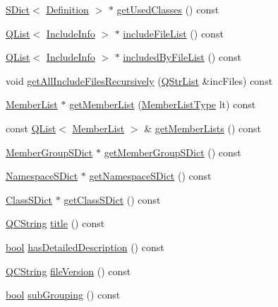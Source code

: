 \begin{DoxyCompactItemize}
\hyperlink{class_s_dict}{S\+Dict}$<$ \hyperlink{class_definition}{Definition} $>$ $\ast$ \hyperlink{class_file_def_a5d56f458c2c6861233549a68215648f7}{get\+Used\+Classes} () const 
\item 
\hyperlink{class_q_list}{Q\+List}$<$ \hyperlink{struct_include_info}{Include\+Info} $>$ $\ast$ \hyperlink{class_file_def_a64b496d47ff8886b45b067367a36cda1}{include\+File\+List} () const 
\item 
\hyperlink{class_q_list}{Q\+List}$<$ \hyperlink{struct_include_info}{Include\+Info} $>$ $\ast$ \hyperlink{class_file_def_aeb30afe2773a1b340af0b5ad29d30ee4}{included\+By\+File\+List} () const 
\item 
void \hyperlink{class_file_def_ac1199e20e088fb05237bf3cd25e8033a}{get\+All\+Include\+Files\+Recursively} (\hyperlink{class_q_str_list}{Q\+Str\+List} \&inc\+Files) const 
\item 
\hyperlink{class_member_list}{Member\+List} $\ast$ \hyperlink{class_file_def_ae15a5a31c32a3fc47acc8b4d6018290f}{get\+Member\+List} (\hyperlink{types_8h_abe8ad5992f8938a28f918f51b199aa19}{Member\+List\+Type} lt) const 
\item 
const \hyperlink{class_q_list}{Q\+List}$<$ \hyperlink{class_member_list}{Member\+List} $>$ \& \hyperlink{class_file_def_a69be4bdc0b4c2793c0d30da65bec5e7b}{get\+Member\+Lists} () const 
\item 
\hyperlink{class_member_group_s_dict}{Member\+Group\+S\+Dict} $\ast$ \hyperlink{class_file_def_a520275a99d696445fbe8dfcacc14ba74}{get\+Member\+Group\+S\+Dict} () const 
\item 
\hyperlink{class_namespace_s_dict}{Namespace\+S\+Dict} $\ast$ \hyperlink{class_file_def_abe6ba0cda81e22e0f5320950bd861ca4}{get\+Namespace\+S\+Dict} () const 
\item 
\hyperlink{class_class_s_dict}{Class\+S\+Dict} $\ast$ \hyperlink{class_file_def_a7b4074e0b92a75975408cafac16a2dee}{get\+Class\+S\+Dict} () const 
\item 
\hyperlink{class_q_c_string}{Q\+C\+String} \hyperlink{class_file_def_a9b02edce3b68a6b9905759eac45506af}{title} () const 
\item 
\hyperlink{qglobal_8h_a1062901a7428fdd9c7f180f5e01ea056}{bool} \hyperlink{class_file_def_aa529a9b7693dfc7356fd2ca850af57df}{has\+Detailed\+Description} () const 
\item 
\hyperlink{class_q_c_string}{Q\+C\+String} \hyperlink{class_file_def_a7646a3e18b7847477c0abbdd18641523}{file\+Version} () const 
\item 
\hyperlink{qglobal_8h_a1062901a7428fdd9c7f180f5e01ea056}{bool} \hyperlink{class_file_def_a92e0190104575d95ff48c68629cf2872}{sub\+Grouping} () const 

\end{DoxyCompactItemize}
